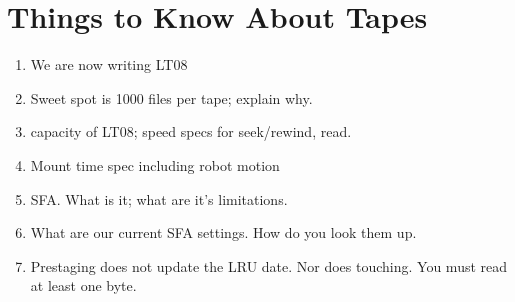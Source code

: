 \chapter{Things to Know About Tapes}
\label{app:AboutTapes}

\begin{enumerate}
  \item We are now writing LT08
  \item Sweet spot is 1000 files per tape; explain why.
  \item capacity of LT08; speed specs for seek/rewind, read.
  \item Mount time spec including robot motion
  \item SFA.  What is it; what are it's limitations.
  \item What are our current SFA settings.  How do you look them up.
  \item Prestaging does not update the LRU date.  Nor does touching.  You must read at least one byte.
\end{enumerate}
